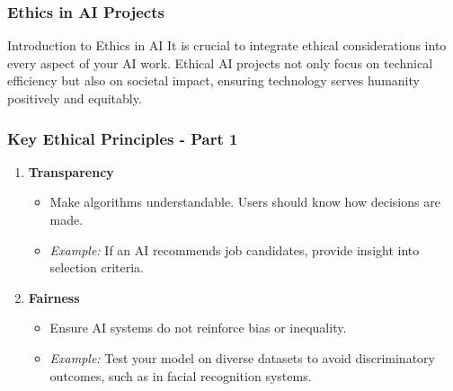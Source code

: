 \documentclass[aspectratio=169]{beamer}
\begin{document}
\begin{frame}[fragile]
    \frametitle{Ethics in AI Projects}
    \begin{block}{Introduction to Ethics in AI}
        It is crucial to integrate ethical considerations into every aspect of your AI work. Ethical AI projects not only focus on technical efficiency but also on societal impact, ensuring technology serves humanity positively and equitably.
    \end{block}
\end{frame}

\begin{frame}[fragile]
    \frametitle{Key Ethical Principles - Part 1}
    \begin{enumerate}
        \item \textbf{Transparency}
            \begin{itemize}
                \item Make algorithms understandable. Users should know how decisions are made.
                \item \textit{Example:} If an AI recommends job candidates, provide insight into selection criteria.
            \end{itemize}

        \item \textbf{Fairness}
            \begin{itemize}
                \item Ensure AI systems do not reinforce bias or inequality.
                \item \textit{Example:} Test your model on diverse datasets to avoid discriminatory outcomes, such as in facial recognition systems.
            \end{itemize}
    \end{enumerate}
\end{frame}
\end{document}
